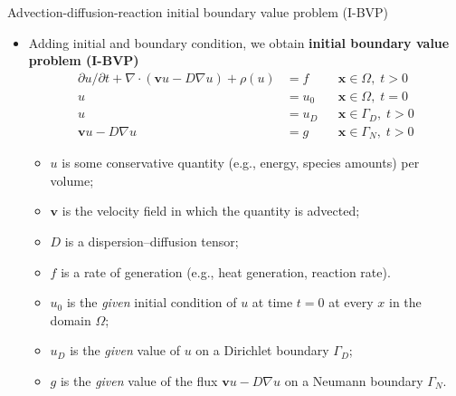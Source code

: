 %
%
\begin{frame}{Advection-diffusion-reaction initial boundary value problem (I-BVP)}

\begin{itemize}
\item Adding initial and boundary condition, 
we obtain \alert{\bf initial boundary value problem (I-BVP)}
%
\begin{align*}
\partial u/\partial t+\nabla\cdot(\boldsymbol{v}u-D\nabla u)  + \rho (u) & =f &  & \boldsymbol{x}\in\Omega,\;t>0\\
u & =u_{0} &  & \boldsymbol{x}\in\Omega,\;t=0\\
u & =u_{D} &  & \boldsymbol{x}\in\Gamma_{D},\;t>0\\
\boldsymbol{v}u-D\nabla u & =g &  & \boldsymbol{x}\in\Gamma_{N},\;t>0
\end{align*}
%
\vskip -5pt
\begin{itemize}
\item $u$ is some \alert{conservative quantity} (e.g., energy, species
amounts) per volume;
\item $\boldsymbol{v}$ is the \alert{velocity field} in which the quantity is advected;
\item $D$ is a \alert{dispersion–diffusion tensor}; 
\item $f$ is a \alert{rate of generation} (e.g., heat generation, reaction
rate).
\item $u_{0}$ is the \emph{given} \alert{initial condition} of $u$ at
time $t=0$ at every $x$ in the domain $\Omega$;
\item $u_{D}$ is the \emph{given} value of $u$ on a \alert{Dirichlet boundary}
$\Gamma_{D}$;
\item $g$ is the \emph{given} value of the flux $\boldsymbol{v}u-D\nabla u$
on a \alert{Neumann boundary} $\Gamma_{N}$.
\end{itemize}
\end{itemize}

\end{frame}
%
